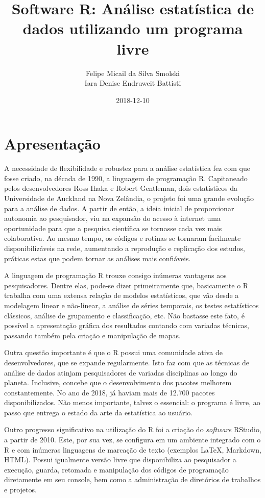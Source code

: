 \documentclass[12pt,portuguese,oneside]{book}
\title{Software R: Análise estatística de dados utilizando um programa livre}
\author{Felipe Micail da Silva Smolski \\ Iara Denise Endruweit Battisti}
\date{2018-12-10}
\begin{document}
\maketitle

{
\setcounter{tocdepth}{1}
\tableofcontents
}
\chapter*{Apresentação}\label{apresentacao}

A necessidade de flexibilidade e robustez para a análise estatística fez
com que fosse criado, na década de 1990, a linguagem de programação R.
Capitaneado pelos desenvolvedores Ross Ihaka e Robert Gentleman, dois
estatísticos da Universidade de Auckland na Nova Zelândia, o projeto foi
uma grande evolução para a análise de dados. A partir de então, a ideia
inicial de proporcionar autonomia ao pesquisador, viu na expansão do
acesso à internet uma oportunidade para que a pesquisa científica se
tornasse cada vez mais colaborativa. Ao mesmo tempo, os códigos e
rotinas se tornaram facilmente disponibilizáveis na rede, aumentando a
reprodução e replicação dos estudos, práticas estas que podem tornar as
análises mais confiáveis.

A linguagem de programação R trouxe consigo inúmeras vantagens aos
pesquisadores. Dentre elas, pode-se dizer primeiramente que, basicamente
o R trabalha com uma extensa relação de modelos estatísticos, que vão
desde a modelagem linear e não-linear, a análise de séries temporais, os
testes estatísticos clássicos, análise de grupamento e classificação,
etc. Não bastasse este fato, é possível a apresentação gráfica dos
resultados contando com variadas técnicas, passando também pela criação
e manipulação de mapas.

Outra questão importante é que o R possui uma comunidade ativa de
desenvolvedores, que se expande regularmente. Isto faz com que as
técnicas de análise de dados atinjam pesquisadores de variadas
disciplinas ao longo do planeta. Inclusive, concebe que o
desenvolvimento dos pacotes melhorem constantemente. No ano de 2018, já
haviam mais de 12.700 pacotes disponibilizados. Não menos importante,
talvez o essencial: o programa é livre, ao passo que entrega o estado da
arte da estatística ao usuário.

Outro progresso significativo na utilização do R foi a criação do
\emph{software} RStudio, a partir de 2010. Este, por sua vez, se
configura em um ambiente integrado com o R e com inúmeras linguagens de
marcação de texto (exemplos LaTeX, Markdown, HTML). Possui igualmente
versão livre que disponibiliza ao pesquisador a execução, guarda,
retomada e manipulação dos códigos de programação diretamente em seu
console, bem como a administração de diretórios de trabalhos e projetos.
\end{document}
